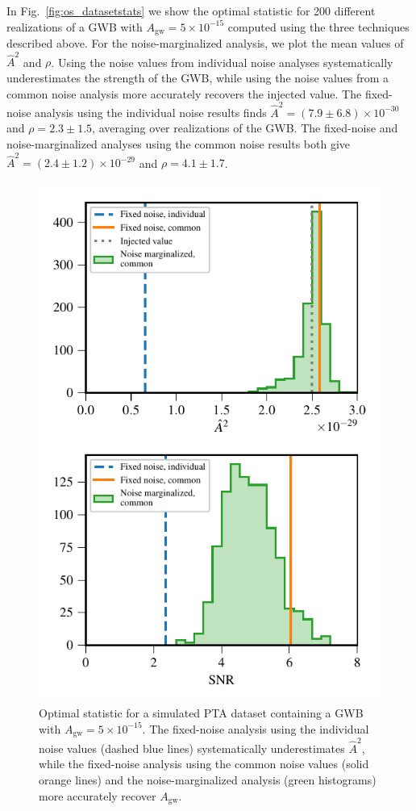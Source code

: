 \documentclass[twocolumn,aps,prd,superscriptaddress]{revtex4-1}
\newcommand{\Agw}{\ensuremath{A_\mathrm{gw}}}
\begin{document}
In Fig.~\ref{fig:os_datasetstats} we show the optimal statistic 
for 200 different realizations of a GWB with $\Agw = 5\times10^{-15}$ 
computed using the three techniques described above. 
For the noise-marginalized analysis, we plot 
the mean values of $\hat{A}^2$ and $\rho$. 
Using the noise values from individual noise analyses 
systematically underestimates the strength of the GWB, 
while using the noise values from a common noise analysis 
more accurately recovers the injected value. 
The fixed-noise analysis using the individual noise results finds 
$\hat{A}^2 = (7.9 \pm 6.8) \times10^{-30}$ and $\rho = 2.3 \pm 1.5$, 
averaging over realizations of the GWB. 
The fixed-noise and noise-marginalized analyses 
using the common noise results both give 
$\hat{A}^2 = (2.4\pm1.2)\times10^{-29}$ and $\rho = 4.1 \pm 1.7$.

\begin{figure}[tb]
	\includegraphics[width=0.9\columnwidth]{plots/optstat_A5e-15_dataset11.pdf}
	\caption{Optimal statistic 
			for a simulated PTA dataset containing a GWB with $\Agw = 5\times10^{-15}$. 
			The fixed-noise analysis using the individual noise values (dashed blue lines) 
			systematically underestimates $\hat{A}^2$, while the 
			fixed-noise analysis using the common noise values (solid orange lines) 
			and the noise-marginalized analysis (green histograms) 
			more accurately recover $\Agw$.}
	\label{fig:os_dataset_sample}
\end{figure}
\end{document}

